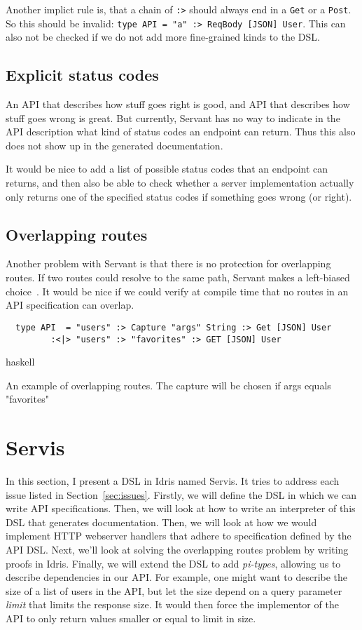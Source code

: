 \documentclass[12pt,a4paper]{article}
\begin{document}
Another implict rule is, that a chain of \texttt{:>} should always end in a \texttt{Get} or a \texttt{Post}. So this should be invalid: \texttt{type API = "a" :> ReqBody [JSON] User}.  This can also not be checked if we do not add more fine-grained kinds to the DSL.

\subsection{Explicit status codes}
An API that describes how stuff goes right is good, and API that describes how stuff goes wrong is great. But currently, Servant has no way to indicate in the API description what kind of status codes an endpoint can return. Thus this also does not show up in the generated documentation.

It would be nice to add a list of possible status codes that an endpoint can returns, and then also be able to check whether a server implementation actually only returns one of the specified status codes if something goes wrong (or right).

\subsection{Overlapping routes}
Another problem with Servant is that there is no protection for overlapping routes. If two routes could resolve to the same path, Servant makes a left-biased choice~\cite{needed}.
It would be nice if we could verify at compile time that no routes in an API specification can overlap.

\begin{listing}
\begin{verbatim}
  type API  = "users" :> Capture "args" String :> Get [JSON] User
         :<|> "users" :> "favorites" :> GET [JSON] User
\end{verbatim}{haskell}
\caption{An example of overlapping routes. The capture will be chosen if args equals "favorites"}
\end{listing}



\section{Servis}
In this section, I present a DSL in Idris named Servis. It tries to address each issue listed in Section~\ref{sec:issues}. Firstly, we will define the DSL in which we can write API specifications. Then, we will look at how to write an interpreter of this DSL that generates documentation. Then, we will look at how we would implement HTTP webserver handlers that adhere to specification defined by the API DSL\@. Next, we'll look at solving the overlapping routes problem by writing proofs in Idris.
Finally, we will extend the DSL to add \emph{pi-types}, allowing us to describe dependencies in our API\@.  For example, one might want to describe  the size of a list of users in the API, but let the size depend on a query parameter \emph{limit} that limits the response size.  It would then force the implementor of the API to only return values smaller or equal to limit in size.
\end{document}
